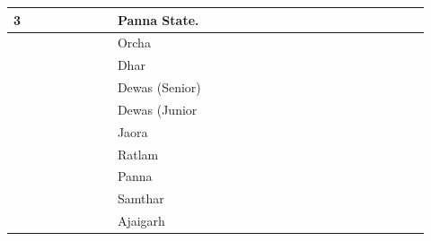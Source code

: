 \begin{longtable}{|p{0.23\linewidth}|p{0.23\linewidth}|p{0.23\linewidth}|p{0.23\linewidth}|}
{3

























} & \multirow{26}{*}{

























Panna State.

























} \\
\hline
 & Orcha

 \\
\hline
 & Dhar

 \\
\hline
 & Dewas (Senior)

 \\
\hline
 & Dewas (Junior

 \\
\hline
 & Jaora

 \\
\hline
 & Ratlam

 \\
\hline
 & Panna

 \\
\hline
 & Samthar

 \\
\hline
 & Ajaigarh


\end{longtable}
